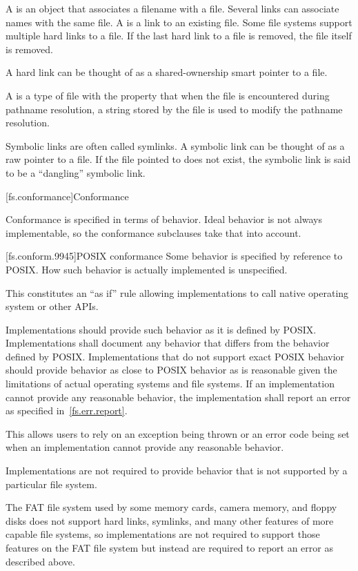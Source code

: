 \pnum
A  is
an object that associates a filename with a file. Several links can associate names with the same file.
A  is
a link to an existing file. Some
file systems support multiple hard links to a file. If the last hard link to a
file is removed, the file itself is removed.
\begin{note}
A hard link can be thought of as a shared-ownership smart
pointer to a file.
\end{note}
A  is
a type of file with the
property that when the file is encountered during pathname resolution, a string
stored by the file is used to modify the pathname resolution.
\begin{note}
Symbolic links are often called symlinks. A symbolic link can be thought of as a raw pointer to a file.
If the file pointed to does not exist, the symbolic link is said to be a
``dangling'' symbolic link.
\end{note}

[fs.conformance]{Conformance}

\pnum
Conformance is specified in terms of behavior. Ideal behavior is not always
implementable, so the conformance subclauses take that into account.

[fs.conform.9945]{POSIX conformance}
\pnum
Some behavior is specified by reference to POSIX. How such behavior is actually implemented is unspecified.
\begin{note}
This constitutes an ``as if'' rule allowing implementations
to call native
operating system or other APIs.
\end{note}

\pnum
Implementations should provide such behavior as it is defined by
POSIX\@. Implementations shall document any behavior that differs from the
behavior defined by POSIX\@. Implementations that do not support exact POSIX
behavior should provide behavior as close to POSIX behavior as is reasonable given the
limitations of actual operating systems and file systems. If an implementation cannot provide any
reasonable behavior, the implementation shall report an error as specified in~\ref{fs.err.report}.
\begin{note}
This allows users to rely on an exception being thrown or
an error code being set when an implementation cannot provide any reasonable
behavior.
\end{note}

\pnum
Implementations are not required to provide behavior that is not supported by
a particular file system.
\begin{example}
The FAT file system used by some memory cards, camera memory, and
floppy disks does not support hard links, symlinks, and many other features of
more capable file systems, so implementations are not required to support those
features on the FAT file system
but instead are required to report an error as described above.
\end{example}

